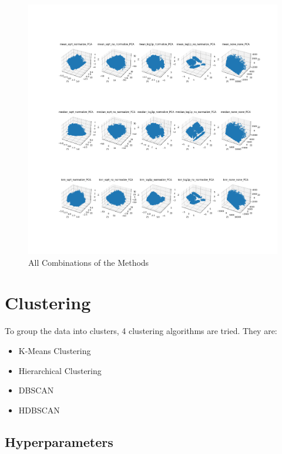 \documentclass{article}
\begin{document}
            \begin{figure}[h]
                \includegraphics[scale=0.275]{data.png}
                \caption{All Combinations of the Methods}
                \label{fig:preprocessed_data}
            \end{figure}
        \endgroup

    \endgroup

    \hfill

    \begingroup
            \section{Clustering}

            To group the data into clusters, 4 clustering algorithms are tried.
            They are:
            \begin{itemize}
                \item K-Means Clustering
                \item Hierarchical Clustering
                \item DBSCAN
                \item HDBSCAN
            \end{itemize}

            \subsection{Hyperparameters}
\end{document}
